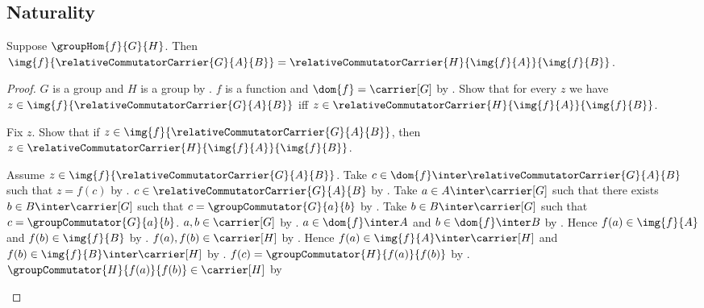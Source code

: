 \subsection{Naturality}

\begin{proposition}\label{group_hom_image_relative_commutator_carrier}
    Suppose $\groupHom{f}{G}{H}$.
    Then
        $\img{f}{\relativeCommutatorCarrier{G}{A}{B}}=
            \relativeCommutatorCarrier{H}{\img{f}{A}}{\img{f}{B}}$.
\end{proposition}
\begin{proof}
    $G$ is a group and $H$ is a group by
        .
    $f$ is a function and $\dom{f}=\carrier[G]$ by
        .
    Show that for every $z$ we have
        $z\in\img{f}{\relativeCommutatorCarrier{G}{A}{B}}$ iff
        $z\in\relativeCommutatorCarrier{H}{\img{f}{A}}{\img{f}{B}}$.
    \begin{subproof}
        Fix $z$.
        Show that if
            $z\in\img{f}{\relativeCommutatorCarrier{G}{A}{B}}$, then
            $z\in\relativeCommutatorCarrier{H}{\img{f}{A}}{\img{f}{B}}$.
        \begin{subproof}
            Assume
                $z\in\img{f}{\relativeCommutatorCarrier{G}{A}{B}}$.
            Take
                $c\in\dom{f}\inter
                    \relativeCommutatorCarrier{G}{A}{B}$ such that
                $z=f(c)$ by .
            $c\in\relativeCommutatorCarrier{G}{A}{B}$ by
                .
            Take $a\in A\inter\carrier[G]$ such that there exists
                $b\in B\inter\carrier[G]$ such that
                $c=\groupCommutator{G}{a}{b}$ by
                .
            Take $b\in B\inter\carrier[G]$ such that
                $c=\groupCommutator{G}{a}{b}$.
            $a,b\in\carrier[G]$ by .
            $a\in\dom{f}\inter A$ and $b\in\dom{f}\inter B$ by
                .
            Hence $f(a)\in\img{f}{A}$ and $f(b)\in\img{f}{B}$ by
                .
            $f(a),f(b)\in\carrier[H]$ by
                .
            Hence
                $f(a)\in\img{f}{A}\inter\carrier[H]$ and
                $f(b)\in\img{f}{B}\inter\carrier[H]$ by
                .
            $f(c)=\groupCommutator{H}{f(a)}{f(b)}$ by
                .
            $\groupCommutator{H}{f(a)}{f(b)}\in\carrier[H]$ by

\end{subproof}
\end{subproof}
\end{proof}
